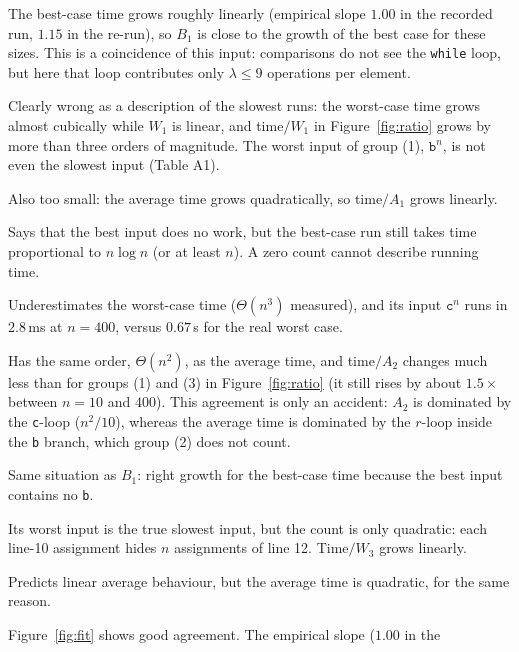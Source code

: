 \documentclass[11pt]{article}
\theoremstyle{remark}
\newcommand{\fl}[1]{\left\lfloor #1\right\rfloor}
\newcommand{\tb}{\texttt{b}}
\newcommand{\tc}{\texttt{c}}
\begin{document}
\begin{description}[leftmargin=1.2em,style=nextline]
\item[$B_1(n)=n$, $\Theta(n)$.] The best-case time grows roughly linearly (empirical slope $1.00$ in the recorded
run, $1.15$ in the re-run), so $B_1$ is close to the growth of the best case for these sizes. This is a coincidence of this input: comparisons do not see
the \texttt{while} loop, but here that loop contributes only $\lambda\le 9$ operations per element.
\item[$W_1(n)=2n$, $\Theta(n)$.] Clearly wrong as a description of the slowest runs: the worst-case time grows almost
cubically while $W_1$ is linear, and time$/W_1$ in Figure~\ref{fig:ratio} grows by more than three orders of
magnitude. The worst input of group (1), $\tb^n$, is not even the slowest input (Table A1).
\item[$A_1(n)=8n/5$, $\Theta(n)$.] Also too small: the average time grows quadratically, so time$/A_1$ grows linearly.
\item[$B_2(n)=0$.] Says that the best input does no work, but the best-case run still takes time proportional to
$n\log n$ (or at least $n$). A zero count cannot describe running time.
\item[$W_2(n)=n(n+1)/2$, $\Theta(n^2)$.] Underestimates the worst-case time ($\Theta(n^3)$ measured), and its input
$\tc^n$ runs in $2.8$\,ms at $n=400$, versus $0.67$\,s for the real worst case.
\item[$A_2(n)$, $\Theta(n^2)$.] Has the same order, $\Theta(n^2)$, as the average time, and time$/A_2$ changes
much less than for groups (1) and (3) in Figure~\ref{fig:ratio} (it still rises by about $1.5\times$ between $n=10$ and
$400$). This agreement is only an accident: $A_2$ is dominated by the \tc-loop ($n^2/10$), whereas the average
time is dominated by the $r$-loop inside the \tb{} branch, which group (2) does not count.
\item[$B_3(n)=n$, $\Theta(n)$.] Same situation as $B_1$: right growth for the best-case time because the best input
contains no \tb.
\item[$W_3(n)=n+\fl{n^2/4}$, $\Theta(n^2)$.] Its worst input is the true slowest input, but the count is only
quadratic: each line-10 assignment hides $n$ assignments of line 12. Time$/W_3$ grows linearly.
\item[$A_3(n)=\frac95n-4+4(\frac45)^n$, $\Theta(n)$.] Predicts linear average behaviour, but the average time is
quadratic, for the same reason.
\item[$B_4(n)$, $\Theta(n\log n)$.] Figure~\ref{fig:fit} shows good agreement. The empirical slope ($1.00$ in the

\end{description}
\end{document}

